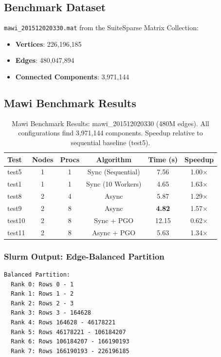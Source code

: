 \documentclass[11pt,a4paper]{article}
\begin{document}
\subsection{Benchmark Dataset}
\texttt{mawi\_201512020330.mat} from the SuiteSparse Matrix Collection:
\begin{itemize}
    \item \textbf{Vertices}: 226,196,185
    \item \textbf{Edges}: 480,047,894
    \item \textbf{Connected Components}: 3,971,144
\end{itemize}

\subsection{Mawi Benchmark Results}

\begin{table}[H]
\centering
\begin{tabular}{lccccc}
\toprule
\textbf{Test} & \textbf{Nodes} & \textbf{Procs} & \textbf{Algorithm} & \textbf{Time (s)} & \textbf{Speedup} \\
\midrule
test5  & 1 & 1  & Sync (Sequential)  & 7.56  & 1.00× \\
test1  & 1 & 1  & Sync (10 Workers)  & 4.65  & 1.63× \\
test8  & 2 & 4  & Async              & 5.87  & 1.29× \\
test9  & 2 & 8  & Async              & \textbf{4.82}  & 1.57× \\
test10 & 2 & 8  & Sync + PGO         & 12.15 & 0.62× \\
test11 & 2 & 8  & Async + PGO        & 5.63  & 1.34× \\
\bottomrule
\end{tabular}
\caption{Mawi Benchmark Results: mawi\_201512020330 (480M edges). All configurations find 3,971,144 components. Speedup relative to sequential baseline (test5).}
\end{table}

\subsubsection{Slurm Output: Edge-Balanced Partition}

\begin{lstlisting}[caption={Edge-Balanced Distribution across 8 MPI Ranks}]
Balanced Partition:
  Rank 0: Rows 0 - 1
  Rank 1: Rows 1 - 2
  Rank 2: Rows 2 - 3
  Rank 3: Rows 3 - 164628
  Rank 4: Rows 164628 - 46178221
  Rank 5: Rows 46178221 - 106184207
  Rank 6: Rows 106184207 - 166190193
  Rank 7: Rows 166190193 - 226196185
\end{lstlisting}
\end{document}

